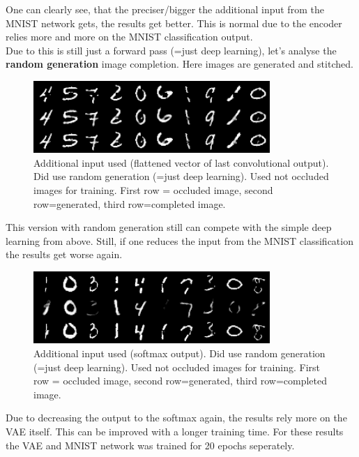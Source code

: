\documentclass[
     11pt,         %
     a4paper,      %
     oneside,
     ]{article}
\begin{document}
One can clearly see, that the preciser/bigger the additional input from the MNIST network gets, the results get better. This is normal due to the encoder relies more and more on the MNIST classification output. \\
Due to this is still just a forward pass (=just deep learning), let's analyse the \textbf{random generation} image completion. Here images are generated and stitched.
\begin{figure}[H]
  \begin{center}
    \includegraphics[width=0.8\textwidth]{presentation_results/VAE/MNIST-VAE-useRandom_true-useMNIST_true-VAERepresentation_1-useOccludedForTrain_false.png}
    \caption{Additional input used (flattened vector of last convolutional output). Did use random generation (=just deep learning). Used not occluded images for training. First row = occluded image, second row=generated, third row=completed image.}
  \end{center}
\end{figure}
This version with random generation still can compete with the simple deep learning from above. Still, if one reduces the input from the MNIST classification the results get worse again.
\begin{figure}[H]
  \begin{center}
    \includegraphics[width=0.8\textwidth]{presentation_results/VAE/MNIST-VAE-useRandom_true-useMNIST_true-VAERepresentation_3-useOccludedForTrain_false.png}
    \caption{Additional input used (softmax output). Did use random generation (=just deep learning). Used not occluded images for training. First row = occluded image, second row=generated, third row=completed image.}
  \end{center}
\end{figure}
Due to decreasing the output to the softmax again, the results rely more on the VAE itself. This can be improved with a longer training time. For these results the VAE and MNIST network was trained for 20 epochs seperately.\\ \ \\
\end{document}
